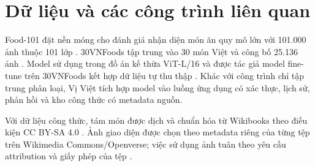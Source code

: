 \section{Dữ liệu và các công trình liên quan}

Food-101 đặt nền móng cho đánh giá nhận diện món ăn quy mô lớn với 101.000
ảnh thuộc 101 lớp \cite{bossard2014food101}. 30VNFoods tập trung vào 30 món
Việt và công bố 25.136 ảnh \cite{do2021_30vnfoods}. Model sử dụng trong đồ
án kế thừa ViT-L/16 và được tác giả model fine-tune trên 30VNFoods kết hợp dữ
liệu tự thu thập \cite{vietTungModel}. Khác với công trình chỉ tập trung phân
loại, Vị Việt tích hợp model vào luồng ứng dụng có xác thực, lịch sử, phản
hồi và kho công thức có metadata nguồn.

Với dữ liệu công thức, tám món được dịch và chuẩn hóa từ Wikibooks theo điều
kiện CC BY-SA 4.0 \cite{wikibooksCopyright}. Ảnh giao diện được chọn theo
metadata riêng của từng tệp trên Wikimedia Commons/Openverse; việc sử dụng
ảnh tuân theo yêu cầu attribution và giấy phép của tệp \cite{commonsReuse}.
